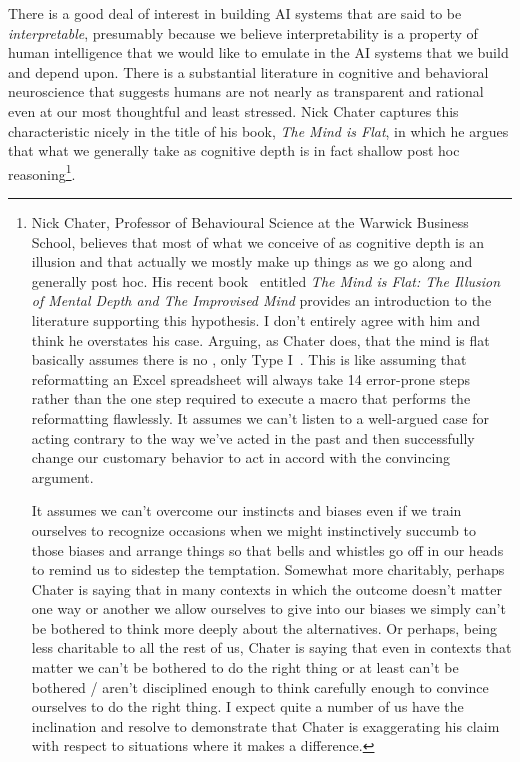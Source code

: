 

There is a good deal of interest in building AI systems that are said to be {\it{interpretable}}, presumably because we believe interpretability is a property of human intelligence that we would like to emulate in the AI systems that we build and depend upon. There is a substantial literature in cognitive and behavioral neuroscience that suggests humans are not nearly as transparent and rational even at our most thoughtful and least stressed. Nick Chater captures this characteristic nicely in the title of his book, {\it{The Mind is Flat}}, in which he argues that what we generally take as cognitive depth is in fact shallow post hoc reasoning\footnote{%
%
  Nick Chater, Professor of Behavioural Science at the Warwick Business School, believes that most of what we conceive of as cognitive depth is an illusion and that actually we mostly make up things as we go along and generally post hoc. His recent book~\cite{Chater2018} entitled {\it{The Mind is Flat: The Illusion of Mental Depth and The Improvised Mind}} provides an introduction to the literature supporting this hypothesis. I don't entirely agree with him and think he overstates his case. Arguing, as Chater does, that the mind is flat basically assumes there is no {}, only Type I~\cite{Kahneman2011}. This is like assuming that reformatting an Excel spreadsheet will always take 14 error-prone steps rather than the one step required to execute a macro that performs the reformatting flawlessly. It assumes we can't listen to a well-argued case for acting contrary to the way we've acted in the past and then successfully change our customary behavior to act in accord with the convincing argument. 

  It assumes we can't overcome our instincts and biases even if we train ourselves to recognize occasions when we might instinctively succumb to those biases and arrange things so that bells and whistles go off in our heads to remind us to sidestep the temptation. Somewhat more charitably, perhaps Chater is saying that in many contexts in which the outcome doesn't matter one way or another we allow ourselves to give into our biases \emdash{} we simply can't be bothered to think more deeply about the alternatives. Or perhaps, being less charitable to all the rest of us, Chater is saying that even in contexts that matter we can't be bothered to do the right thing \emdash{} or at least can't be bothered / aren't disciplined enough to think carefully enough to convince ourselves to do the right thing. I expect quite a number of us have the inclination and resolve to demonstrate that Chater is exaggerating his claim with respect to situations where it makes a difference.}.

